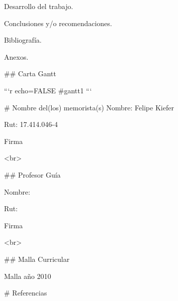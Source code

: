 \documentclass{article}\usepackage[]{graphicx}\usepackage[]{xcolor}
\begin{document}
Desarrollo del trabajo.

Conclusiones y/o recomendaciones.

Bibliografía.

Anexos.

## Carta Gantt

```{r echo=FALSE}
#gantt1
```

\pagebreak
# Nombre del(los) memorista(s)
Nombre:     Felipe Kiefer

Rut:        17.414.046-4

Firma

<br>

## Profesor Guía

Nombre:

Rut:

Firma

<br>

## Malla Curricular

Malla año 2010

\pagebreak
# Referencias
\end{document}
